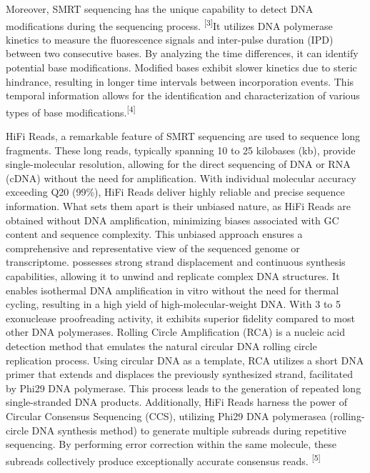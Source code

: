 \documentclass[
]{article}
\begin{document}
Moreover, SMRT sequencing has the unique capability to detect DNA
modifications during the sequencing process. \textsuperscript{{[}3{]}}It
utilizes DNA polymerase kinetics to measure the fluorescence signals and
inter-pulse duration (IPD) between two consecutive bases. By analyzing
the time differences, it can identify potential base modifications.
Modified bases exhibit slower kinetics due to steric hindrance,
resulting in longer time intervals between incorporation events. This
temporal information allows for the identification and characterization
of various types of base modifications.\textsuperscript{{[}4{]}}

HiFi Reads, a remarkable feature of SMRT sequencing are used to sequence
long fragments. These long reads, typically spanning 10 to 25 kilobases
(kb), provide single-molecular resolution, allowing for the direct
sequencing of DNA or RNA (cDNA) without the need for amplification. With
individual molecular accuracy exceeding Q20 (99\%), HiFi Reads deliver
highly reliable and precise sequence information. What sets them apart
is their unbiased nature, as HiFi Reads are obtained without DNA
amplification, minimizing biases associated with GC content and sequence
complexity. This unbiased approach ensures a comprehensive and
representative view of the sequenced genome or transcriptome. possesses
strong strand displacement and continuous synthesis capabilities,
allowing it to unwind and replicate complex DNA structures. It enables
isothermal DNA amplification in vitro without the need for thermal
cycling, resulting in a high yield of high-molecular-weight DNA. With
3\textquotesingle{} to 5\textquotesingle{} exonuclease proofreading
activity, it exhibits superior fidelity compared to most other DNA
polymerases. Rolling Circle Amplification (RCA) is a nucleic acid
detection method that emulates the natural circular DNA rolling circle
replication process. Using circular DNA as a template, RCA utilizes a
short DNA primer that extends and displaces the previously synthesized
strand, facilitated by Phi29 DNA polymerase. This process leads to the
generation of repeated long single-stranded DNA products. Additionally,
HiFi Reads harness the power of Circular Consensus Sequencing (CCS),
utilizing Phi29 DNA polymerasea (rolling-circle DNA synthesis method) to
generate multiple subreads during repetitive sequencing. By performing
error correction within the same molecule, these subreads collectively
produce exceptionally accurate consensus reads.
\textsuperscript{{[}5{]}}
\end{document}
